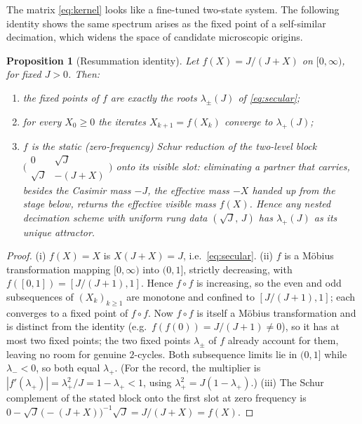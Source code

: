 \documentclass[11pt,a4paper]{article}
\newtheorem{proposition}{Proposition}
\theoremstyle{definition}
\begin{document}
The matrix \eqref{eq:kernel} looks like a fine-tuned two-state system. The
following identity shows the same spectrum arises as the fixed point of a
self-similar decimation, which widens the space of candidate microscopic
origins.

\begin{proposition}[Resummation identity]
\label{prop:ladder}
Let $f(X)=J/(J+X)$ on $[0,\infty)$, for fixed $J>0$. Then:
\begin{enumerate}
\item[(i)] the fixed points of $f$ are exactly the roots
$\lambda_\pm(J)$ of \eqref{eq:secular};
\item[(ii)] for every $X_0\ge0$ the iterates $X_{k+1}=f(X_k)$ converge to
$\lambda_+(J)$;
\item[(iii)] $f$ is the static (zero-frequency) Schur reduction of the
two-level block
$\bigl(\begin{smallmatrix}0&\sqrt J\\ \sqrt J&-(J+X)\end{smallmatrix}\bigr)$
onto its visible slot: eliminating a partner that carries, besides the
Casimir mass $-J$, the effective mass $-X$ handed up from the stage below,
returns the effective visible mass $f(X)$. Hence any nested decimation
scheme with uniform rung data $(\sqrt J,\,J)$ has $\lambda_+(J)$ as its
unique attractor.
\end{enumerate}
\end{proposition}

\begin{proof}
(i) $f(X)=X$ is $X(J+X)=J$, i.e.\ \eqref{eq:secular}.
(ii) $f$ is a M\"obius transformation mapping $[0,\infty)$ into $(0,1]$,
strictly decreasing, with $f([0,1])=[J/(J{+}1),1]$. Hence $f\circ f$ is
increasing, so the even and odd subsequences of $(X_k)_{k\ge1}$ are
monotone and confined to $[J/(J{+}1),1]$; each converges to a fixed point
of $f\circ f$. Now $f\circ f$ is itself a M\"obius transformation and is
distinct from the identity (e.g.\ $f(f(0))=J/(J{+}1)\ne0$), so it has at
most two fixed points; the two fixed points $\lambda_\pm$ of $f$ already
account for them, leaving no room for genuine $2$-cycles. Both subsequence
limits lie in $(0,1]$ while $\lambda_-<0$, so both equal $\lambda_+$.
(For the record, the multiplier is
$|f'(\lambda_+)|=\lambda_+^2/J=1-\lambda_+<1$, using
$\lambda_+^2=J(1-\lambda_+)$.)
(iii) The Schur complement of the stated block onto the first slot at zero
frequency is $0-\sqrt J\,\bigl(-(J+X)\bigr)^{-1}\sqrt J=J/(J+X)=f(X)$.
\end{proof}
\end{document}
